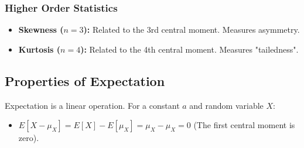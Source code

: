 \documentclass[11pt]{article}
\begin{document}
\subsubsection{Higher Order Statistics}
\begin{itemize}
    \item \textbf{Skewness ($n=3$):} Related to the 3rd central moment. Measures asymmetry.
    \item \textbf{Kurtosis ($n=4$):} Related to the 4th central moment. Measures "tailedness".
\end{itemize}

\subsection{Properties of Expectation}
Expectation is a linear operation. For a constant $a$ and random variable $X$:
\begin{itemize}
    \item $E[X - \mu_X] = E[X] - E[\mu_X] = \mu_X - \mu_X = 0$ (The first central moment is zero).
\end{itemize}
\end{document}
